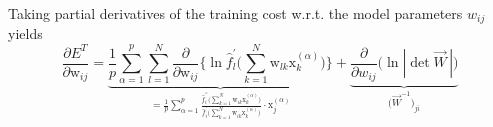 \begin{frame}{\secname}


\noindent Taking partial derivatives of the training cost w.r.t. the model parameters $w_{ij}$ yields
\begin{equation}
	\frac{\partial E^T}{\partial \mathrm{w}_{ij}}
	= \underbrace{
    \frac{1}{p} \sum\limits_{\alpha = 1}^p 
		\sum\limits_{l = 1}^N \frac{\partial}{\partial \mathrm{w}_{ij}}
		\Bigg\{ \ln \widehat{f}_l^{'} \Bigg( \sum\limits_{k = 1}^N 
		\mathrm{w}_{lk} \mathrm{x}_k^{(\alpha)} \Bigg) \Bigg\}
        }_{ =
			\frac{1}{p} \sum\limits_{\alpha = 1}^p 
			\frac{ \widehat{f}_i^{''} \Big( \sum\limits_{k = 1}^N 
				\mathrm{w}_{ik} \mathrm{x}_k^{(\alpha)} \Big)
			}{\widehat{f}_i^{'} \Big( \sum\limits_{k = 1}^N 
			\mathrm{w}_{ik} \mathrm{x}_k^{(\alpha)} \Big)}
			\cdot \mathrm{x}_j^{(\alpha)} }
		+ \underbrace{ \frac{\partial}{\partial w_{ij}}
			\big( \ln |\det \vec{W}\,| \big) }_{
				\big( \vec{W}^{-1} \big)_{ji} }
\end{equation}

\end{frame}

